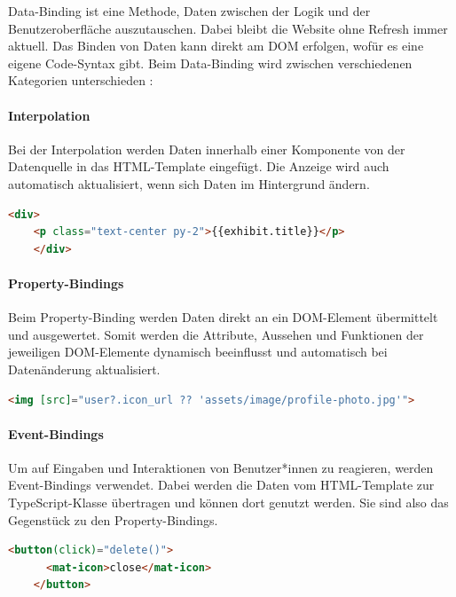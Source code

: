 Data-Binding ist eine Methode, Daten zwischen der Logik und der Benutzeroberfläche auszutauschen. Dabei bleibt die Website ohne Refresh immer aktuell. Das Binden von Daten kann direkt am DOM erfolgen, wofür es eine eigene Code-Syntax gibt. Beim Data-Binding wird zwischen  verschiedenen Kategorien unterschieden \cite{AngularBuch} \cite{BindingSyntax}:  
    

\paragraph{Interpolation}
Bei der Interpolation werden Daten innerhalb einer Komponente von der Datenquelle in das HTML-Template eingefügt. Die Anzeige wird auch automatisch aktualisiert, wenn sich Daten im Hintergrund ändern.

\begin{lstlisting}[caption={{Beispiel für Interpolation in der 3D-Gallery}},language=HTML,label=lst:impl:interpolation]
    <div>
    <p class="text-center py-2">{{exhibit.title}}</p>
    </div>
\end{lstlisting}

\paragraph{Property-Bindings}
Beim Property-Binding werden Daten direkt an ein DOM-Element übermittelt und ausgewertet. Somit werden die Attribute, Aussehen und Funktionen der jeweiligen DOM-Elemente dynamisch beeinflusst und automatisch bei Datenänderung aktualisiert. \cite{AngularPropertyBinding}
\begin{lstlisting}[caption={{Beispiel für Property-Bindings in der 3D-Gallery}},language=HTML,label=lst:impl:property-binding]
    <img [src]="user?.icon_url ?? 'assets/image/profile-photo.jpg'">
\end{lstlisting}

\paragraph{Event-Bindings}
Um auf Eingaben und Interaktionen von Benutzer*innen zu reagieren, werden Event-Bindings verwendet. Dabei werden die Daten vom HTML-Template zur TypeScript-Klasse übertragen und können dort genutzt werden. Sie sind also das Gegenstück zu den Property-Bindings. \cite{AngularEventBinding}
\begin{lstlisting}[caption={{Beispiel für Event-Bindings in der 3D-Gallery}},language=HTML,label=lst:impl:event-binding]
    <button(click)="delete()">
      <mat-icon>close</mat-icon>
    </button>
\end{lstlisting}

